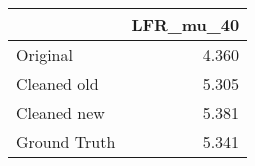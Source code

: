 \begin{tabular}{lr}
\toprule
{} & LFR_mu_40 \\
\midrule
Original     &     4.360 \\
Cleaned old  &     5.305 \\
Cleaned new  &     5.381 \\
Ground Truth &     5.341 \\
\bottomrule
\end{tabular}
